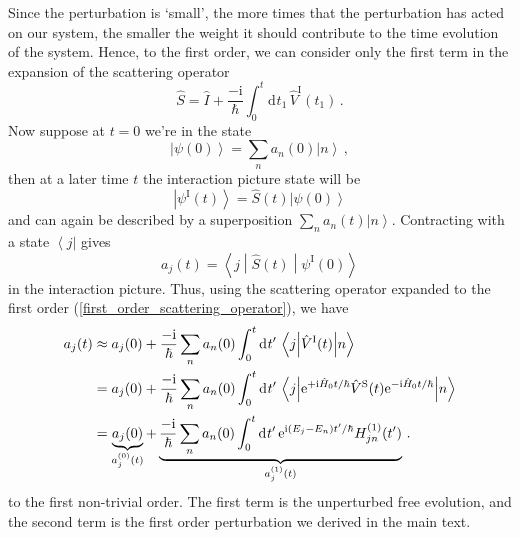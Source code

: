 \documentclass{article}
\theoremstyle{plain}\theoremheaderfont{\normalfont\itshape}\theorembodyfont{\rmfamily}\theoremseparator{.}\newtheorem*{rem}{Remark}\newtheorem*{ex}{Example}\newtheorem*{proof}{Proof}\newtheorem*{altp}{Alternative proof}
\theoremstyle{plain}\theoremheaderfont{\normalfont\bfseries}\theorembodyfont{\rmfamily}\theoremseparator{.}\newtheorem{thm}{Theorem}[section]\newtheorem{lem}[thm]{Lemma}\newtheorem{prop}[thm]{Proposition}\newtheorem*{cor}{Corollary}\newtheorem{defn}[thm]{Definition}\newtheorem{clm}[thm]{Claim}\newtheorem{clminproof}{Claim}
\theoremstyle{break}\theoremheaderfont{\normalfont\itshape}\theorembodyfont{\rmfamily}\theoremseparator{.\medskip}\newtheorem*{proofskip}{Proof}\newtheorem*{exs}{Examples}\newtheorem*{rems}{Remarks}
\theoremstyle{break}\theoremheaderfont{\normalfont\bfseries}\theorembodyfont{\rmfamily}\theoremseparator{.\medskip}\newtheorem{lemskip}[thm]{Lemma}\newtheorem{defnskip}[thm]{Definition}\newtheorem{propskip}[thm]{Proposition}\newtheorem{thmskip}[thm]{Theorem}
\numberwithin{equation}{section}
\newcommand{\ii}{\mathrm{i}}
\newcommand{\ee}{\mathrm{e}}
\newcommand{\dd}[2][]{\mathrm{d}^{#1} #2\,}
\newcommand{\bra}[1]{\left\langle #1 \right|}
\newcommand{\ket}[1]{\left| #1 \right\rangle}
\newcommand{\mel}[3]{\left\langle #1 \middle| #2 \middle| #3 \right\rangle}
\newcommand{\Sch}{^{\mathrm{S}}}
\newcommand{\Int}{^{\mathrm{I}}}
\begin{document}
    Since the perturbation is `small', the more times that the perturbation has acted on our system, the smaller the weight it should contribute to the time evolution of the system. Hence, to the first order, we can consider only the first term in the expansion of the scattering operator
    \begin{equation}\label{first_order_scattering_operator}
        \hat{S}=\hat{I}+\frac{-\ii}{\hbar}\int_{0}^{t}\dd{t_1}\hat{V}\Int(t_1)\,.
    \end{equation}
    Now suppose at \(t=0\) we're in the state
    \begin{equation}
        \ket{\psi(0)}=\sum_n a_n(0)\ket{n}\,,
    \end{equation}
    then at a later time \(t\) the interaction picture state will be
    \begin{equation}
        \ket{\psi\Int(t)}=\hat{S}(t)\ket{\psi(0)}
    \end{equation}
    and can again be described by a superposition \(\sum_n a_n(t)\ket{n}\). Contracting with a state \(\bra{j}\) gives
    \begin{equation}
        a_j(t)=\mel{j}{\hat{S}(t)}{\psi\Int(0)}
    \end{equation}
    in the interaction picture. Thus, using the scattering operator expanded to the first order (\ref{first_order_scattering_operator}), we have
    \begin{align}
        a_j(t)&\approx a_j(0)+\frac{-\ii}{\hbar}\sum_n a_n(0)\int_{0}^{t}\dd{t'}\mel{j}{\hat{V}\Int(t)}{n}\notag\\
        &=a_j(0)+\frac{-\ii}{\hbar}\sum_n a_n(0)\int_{0}^{t}\dd{t'}\mel{j}{\ee^{+\ii\hat{H}_0t/\hbar}\hat{V}\Sch(t)\ee^{-\ii\hat{H}_0t/\hbar}}{n}\notag\\
        &=\underbrace{a_j(0)}_{a_j^{(0)}(t)}+\underbrace{\frac{-\ii}{\hbar}\sum_n a_n(0)\int_{0}^{t}\dd{t'}\ee^{\ii(E_j-E_n)t'/\hbar}H_{jn}^{(1)}(t')}_{a_j^{(1)}(t)}\,.
    \end{align}
    to the first non-trivial order. The first term is the unperturbed free evolution, and the second term is the first order perturbation we derived in the main text.
\end{document}
